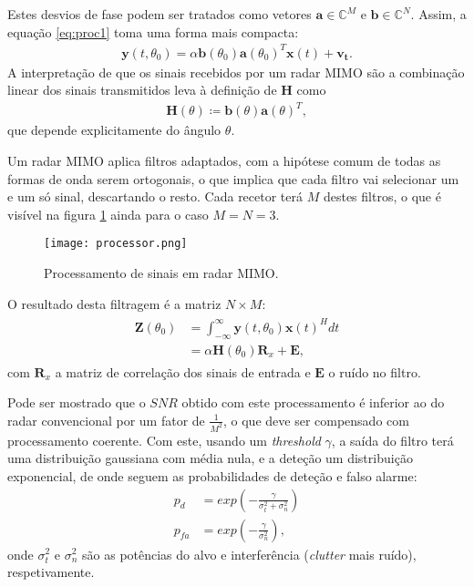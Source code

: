 \documentclass[purist,portuguese]{ist-report}
\begin{document}
Estes desvios de fase podem ser tratados como vetores $\mathbf{a} \in \mathbb{C}^M$ e $\mathbf{b} \in \mathbb{C}^N$.
Assim, a equação \ref{eq:proc1} toma uma forma mais compacta:
\begin{align}
  \mathbf{y}(t,\theta_0) = \alpha\mathbf{b}(\theta_0)\mathbf{a}(\theta_0)^T\mathbf{x}(t)+\mathbf{v_t}.
  \label{eq:radc}
\end{align}
A interpretação de que os sinais recebidos por um radar MIMO são a combinação linear dos sinais transmitidos leva à definição de $\mathbf{H}$ como
\begin{align}
  \mathbf{H}(\theta) \coloneqq \mathbf{b}(\theta)\mathbf{a}(\theta)^T,
  \label{eq:H}
\end{align}
que depende explicitamente do ângulo $\theta$.

Um radar MIMO aplica filtros adaptados, com a hipótese comum de todas as formas de onda serem ortogonais, o que implica que cada filtro vai selecionar um e um só sinal, descartando o resto.
Cada recetor terá $M$ destes filtros, o que é visível na figura \ref{fig:proc} ainda para o caso $M=N=3$.

\begin{figure}[ht]
  \centering
  \texttt{[image: processor.png]}
  \caption{Processamento de sinais em radar MIMO.}
  \label{fig:proc}
\end{figure}

O resultado desta filtragem é a matriz $N\times M$:
\begin{align}
  \begin{aligned}
    \mathbf{Z}(\theta_0) &= \int_{-\infty}^{\infty} \mathbf{y}(t,\theta_0)\mathbf{x}(t)^Hdt \\
	&= \alpha \mathbf{H}(\theta_0)\mathbf{R}_x + \mathbf{E} ,
  \end{aligned}
  \label{eq:Z}
\end{align}
com $\mathbf{R}_x$ a matriz de correlação dos sinais de entrada e $\mathbf{E}$ o ruído no filtro.

Pode ser mostrado que o $SNR$ obtido com este processamento é inferior ao do radar convencional por um fator de $\frac{1}{M^2}$, o que deve ser compensado com processamento coerente.
Com este, usando um \textit{threshold} $\gamma$, a saída do filtro terá uma distribuição gaussiana com média nula, e a deteção um distribuição exponencial, de onde seguem as probabilidades de deteção e falso alarme:
\begin{align}
  p_d &= exp\left( -\frac{\gamma}{\sigma_t^2 + \sigma_n^2} \right) \label{eq:pd} \\
  p_{fa} &= exp\left( -\frac{\gamma}{\sigma_n^2} \right) \label{eq:pfa},
\end{align}
onde $\sigma_t^2$ e $\sigma_n^2$ são as potências do alvo e interferência (\textit{clutter} mais ruído), respetivamente.
\end{document}

